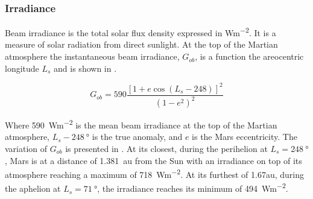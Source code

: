 \subsubsection{Irradiance}
\label{sec:MartianEnvironment:SolarRadiation:Irradiance}

Beam irradiance is the total solar flux density expressed in \si{Wm^{-2}}. It is a measure of solar radiation from direct sunlight. At the top of the Martian atmosphere the instantaneous beam irradiance, $G_{ob}$, is a function the areocentric longitude $L_{s}$ and is shown in .

\begin{equation}
  \label{eq:G_ob}
  G_{ob} = 590 \frac{[1 + e \cos{(L_{s} - 248)}]^2}{(1-e^2)^2}
\end{equation}

Where \SI{590}{Wm^{-2}} is the mean beam irradiance at the top of the Martian atmosphere, $L_{s} - \SI{248}{\degree}$ is the true anomaly, and $e$ is the Mars eccentricity. The variation of $G_{ob}$ is presented in . At its closest, during the perihelion at $L_{s} = \SI{248}{\degree}$, Mars is at a distance of \SI{1.381}{\astronomicalunit} from the Sun with an irradiance on top of its atmosphere reaching a maximum of \SI{718}{Wm^{-2}}. At its furthest of 1.67\si{\astronomicalunit}, during the aphelion at $L_{s} = \SI{71}{\degree}$, the irradiance reaches its minimum of \SI{494}{Wm^{-2}}.

\vspace{0.3cm}

